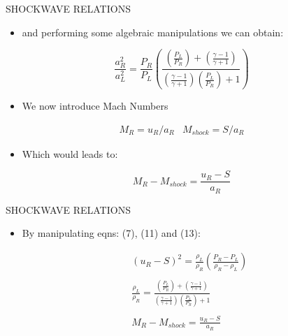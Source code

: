 \documentclass{beamer}
\begin{document}
\begin{frame}{SHOCKWAVE RELATIONS}
  \begin{itemize}
   \item and performing some algebraic manipulations we can obtain:
  \end{itemize}
  \begin{equation}
    \frac{a_R^2}{a_L^2}=\frac{P_R}{P_L}\left (\frac{\left(\frac{P_L}{P_R}\right)+\left(\frac{\gamma-1}{\gamma+1}\right)}{\left(\frac{\gamma-1}{\gamma+1}\right)\left(\frac{P_L}{P_R}\right)+1}  \right )
  \end{equation}
  \begin{itemize}
   \item We now introduce Mach Numbers
  \end{itemize}
  \begin{equation}
   \begin{matrix}
    M_R=u_R/a_R & M_{shock}=S/a_R
   \end{matrix} \nonumber
  \end{equation}
  \begin{itemize}
   \item Which would leads to:
  \end{itemize}
  \begin{equation}
   M_R-M_{shock}=\frac{u_R-S}{a_R}
  \end{equation}
\end{frame}

\begin{frame}{SHOCKWAVE RELATIONS}
  \begin{itemize}
   \item By manipulating eqns: \alert{(7)}, \alert{(11)} and \alert{(13)}:
  \end{itemize}
  \begin{eqnarray}
    && (u_R-S)^2=\frac{\rho_L}{\rho_R}\left ( \frac{P_R-P_L}{\rho_R-\rho_L} \right )\nonumber \\
    && \nonumber\\
    && \frac{\rho_L}{\rho_R}=\frac{\left(\frac{P_L}{P_R}\right)+\left(\frac{\gamma-1}{\gamma+1}\right)}{\left(\frac{\gamma-1}{\gamma+1}\right)\left(\frac{P_L}{P_R}\right)+1}\nonumber \\
    && \nonumber\\
    && M_R-M_{shock}=\frac{u_R-S}{a_R} \nonumber
  \end{eqnarray}
\end{frame}
\end{document}
